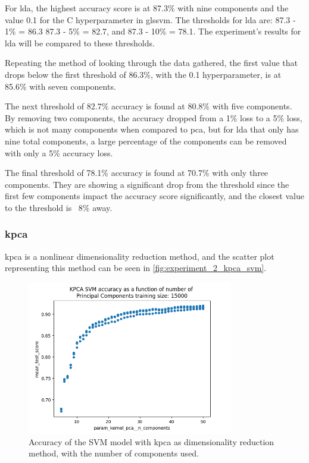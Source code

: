 For \gls{lda}, the highest accuracy score is at 87.3\% with nine components and the value 0.1 for the C hyperparameter in gls{svm}. The thresholds for \gls{lda} are: 87.3 - 1\% = 86.3 87.3 - 5\% = 82.7, and 87.3 - 10\% = 78.1. The experiment's results for \gls{lda} will be compared to these thresholds.

Repeating the method of looking through the data gathered, the first value that drops below the first threshold  of 86.3\%, with the 0.1 hyperparameter, is at 85.6\% with seven components.

The next threshold of 82.7\% accuracy is found at 80.8\% with five components. By removing two components, the accuracy dropped from a 1\% loss to a 5\% loss, which is not many components when compared to \gls{pca}, but for \gls{lda} that only has nine total components, a large percentage of the components can be removed with only a 5\% accuracy loss.

The final threshold of 78.1\% accuracy is found at 70.7\% with only three components. They are showing a significant drop from the threshold since the first few components impact the accuracy score significantly, and the closest value to the threshold is ~8\% away.


\subsubsection{\gls{kpca}}\label{subsubsec:experiment_2_kpca}
\gls{kpca} is a nonlinear dimensionality reduction method, and the scatter plot representing this method can be seen in \autoref{fig:experiment_2_kpca_svm}.

\begin{figure}[htb!]
    \centering
    \includegraphics[width=0.8\textwidth]{figures/experiment_two/kpca_svm_15000.png}
    \caption{Accuracy of the SVM model with \gls{kpca} as dimensionality reduction method, with the number of components used.}
    \label{fig:experiment_2_kpca_svm}
\end{figure}

